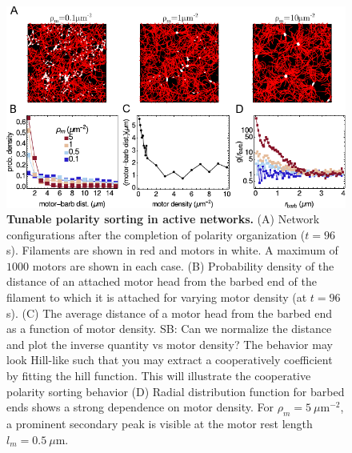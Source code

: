 \documentclass[11pt]{article}
\begin{document}
\begin{figure}[H]
\centering
    \includegraphics[width=\columnwidth] {figs/polarity_sorting/ps_fig.pdf}
  \caption{%
  \label{fig:polarity_sorting}%
 {\bf Tunable polarity sorting in active networks.} (A)
  Network configurations after the completion of polarity organization ($t=96$ s). 
  Filaments {\color{red}are shown} in red and motors in white. A maximum of $1000$ motors are shown in each case.
 (B) {\color{red}Probability density} of the distance of an attached motor
   head from the barbed end of the filament to which it is attached for varying motor density (at $t=96$ s).
 (C) The average distance of a motor head from the barbed end as a function of motor density. {\color{blue} SB: Can we normalize the distance and plot the inverse quantity vs motor density? The behavior may look Hill-like such that you may extract a cooperatively coefficient by fitting the hill function. This will illustrate the cooperative polarity sorting behavior}
 (D) Radial distribution function for barbed ends shows a strong dependence on motor density. For $\rho_m=5\ \mu$m$^{-2}$, a {\color{red}prominent secondary} peak is visible at the motor rest length $l_m=0.5\ \mu$m.
 } 
 \end{figure}
\end{document}
